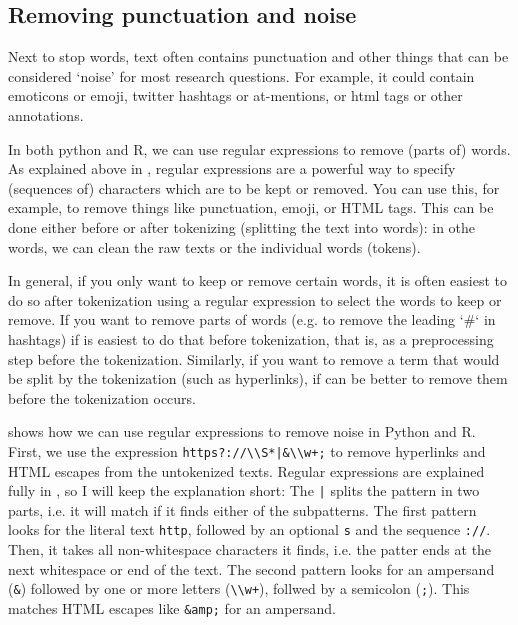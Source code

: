 \subsection{Removing punctuation and noise}

Next to stop words, text often contains punctuation and other things that can be considered `noise' for most research questions.
For example, it could contain emoticons or emoji, twitter hashtags or at-mentions, or html tags or other annotations.

In both python and R, we can use regular expressions to remove (parts of) words. 
As explained above in , regular expressions are a powerful way to specify (sequences of) characters which are to be kept or removed.
You can use this, for example, to remove things like punctuation, emoji, or HTML tags.
This can be done either before or after tokenizing (splitting the text into words):
in othe words, we can clean the raw texts or the individual words (tokens). 

In general, if you only want to keep or remove certain words, it is often easiest to do so after tokenization
using a regular expression to select the words to keep or remove.
If you want to remove parts of words (e.g. to remove the leading `\#` in hashtags) if is easiest to do that before tokenization,
that is, as a preprocessing step before the tokenization.
Similarly, if you want to remove a term that would be split by the tokenization (such as hyperlinks),
if can be better to remove them before the tokenization occurs.

 shows how we can use regular expressions to remove noise in Python and R.
First, we use the expression \verb#https?://\\S*|&\\w+;# to remove hyperlinks and HTML escapes from the untokenized texts.
Regular expressions are explained fully in , so I will keep the explanation short:
The \verb#|# splits the pattern in two parts, i.e. it will match if it finds either of the subpatterns.
The first pattern looks for the literal text \verb#http#, followed by an optional \verb#s# and the sequence \verb#://#.
Then, it takes all non-whitespace characters it finds, i.e. the patter ends at the next whitespace or end of the text.
The second pattern looks for an ampersand (\verb#&#) followed by one or more letters (\verb#\\w+#), follwed by a semicolon (\verb#;#).
This matches HTML escapes like \verb#&amp;# for an ampersand.

